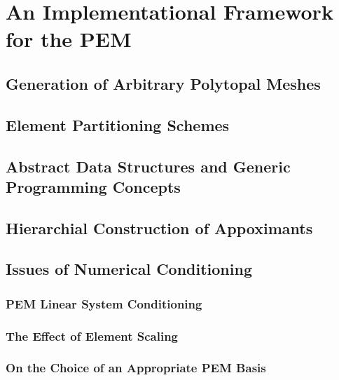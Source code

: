 \chapter{An Implementational Framework for the PEM} \label{ch:implementation}
%
\section{Generation of Arbitrary Polytopal Meshes}

\section{Element Partitioning Schemes}

\section{Abstract Data Structures and Generic Programming Concepts}

\section{Hierarchial Construction of Appoximants}

\section{Issues of Numerical Conditioning}
\subsection{PEM Linear System Conditioning}
\subsection{The Effect of Element Scaling}
\subsection{On the Choice of an Appropriate PEM Basis}
